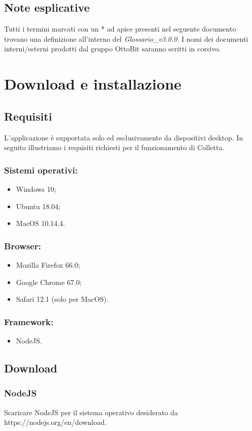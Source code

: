 \documentclass[11pt,a4paper]{article}
\begin{document}
{	\subsection{Note esplicative}
	Tutti i termini marcati con un * ad apice presenti nel seguente documento trovano una definizione
	all’interno del \textit{Glossario\_v3.0.0}.
	I nomi dei documenti interni/esterni prodotti dal gruppo OttoBit saranno scritti in corsivo.
	\newpage
	\section{Download e installazione}
	\subsection{Requisiti}
	L'applicazione è supportata solo ed esclusivamente da dispositivi desktop. In seguito illustriamo i requisiti richiesti per il funzionamento di Colletta.
	\subsubsection{Sistemi operativi:} 
	\begin{itemize}
		\item Windows 10;
		\item Ubuntu 18.04;
		\item MacOS 10.14.4.		
	\end{itemize}
	\subsubsection{Browser:}
		\begin{itemize}
		\item Mozilla Firefox 66.0;
		\item Google Chrome 67.0;
		\item Safari 12.1 (solo per MacOS).		
	\end{itemize}
	\subsubsection{Framework:}
		\begin{itemize}
		\item NodeJS.
		\end{itemize}
	

	\subsection{Download}
	\subsubsection{NodeJS}
	Scaricare NodeJS per il sistema operativo desiderato da https://nodejs.org/en/download.
}
\end{document}
